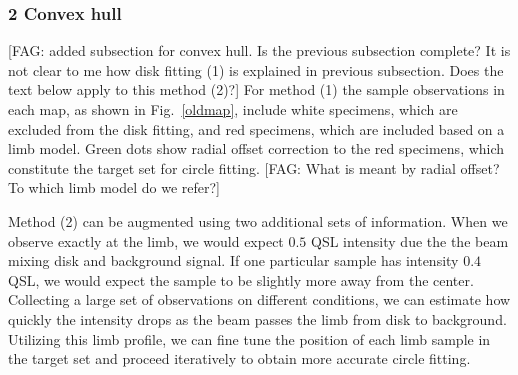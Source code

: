 \documentclass{aa}
\newcommand{\fag}[1]{\textcolor{midpurple}{[FAG: #1]}} %
\begin{document}
  \subsubsection{2 Convex hull}\label{sect:convex-hull}
  \fag{added subsection for convex hull. Is the previous subsection complete?
  It is not clear to me how disk fitting (1) is explained in previous
  subsection.
  Does the text below apply to this method (2)?}
  For method (1) the sample observations in each map, as shown in
  Fig.~\ref{oldmap}, include white specimens, which are excluded from the disk
  fitting, and red specimens, which are included based on a limb model.
  Green dots show radial offset correction to the red specimens, which constitute
  the target set for circle fitting.
  \fag{What is meant by radial offset? To which limb model do we refer?}


  Method (2) can be augmented using two additional sets of information.
  When we observe exactly at the limb, we would expect $0.5$ QSL intensity
  due the the beam mixing disk and background signal.
  If one particular sample has intensity $0.4$ QSL, we would expect the
  sample to be slightly more away from the center.
  Collecting a large set of observations on different conditions, we can
  estimate how quickly the intensity drops as the beam passes the limb 
  from disk to background.
  Utilizing this limb profile, we can fine tune the position of each limb
  sample in the target set and proceed iteratively to obtain more
  accurate circle fitting.
  
\end{document}
